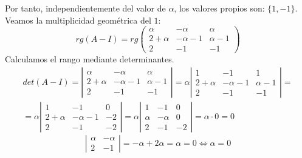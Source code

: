 \begin{ejercicio}
\begin{enumerate}
        Por tanto, independientemente del valor de $\alpha$, los valores propios son: $\{1, -1\}$. Veamos la multiplicidad geométrica del $1$:
        \begin{equation*}
            rg(A-I) = rg\left(\begin{array}{ccc}
            \alpha & -\alpha & \alpha \\
            2+\alpha & -\alpha-1 & \alpha-1 \\
            2 & -1 & -1
        \end{array} \right)
        \end{equation*}
        Calculamos el rango mediante determinantes.
        \begin{multline*}
            det(A-I) = \left|\begin{array}{ccc}
            \alpha & -\alpha & \alpha \\
            2+\alpha & -\alpha-1 & \alpha-1 \\
            2 & -1 & -1
        \end{array} \right| = \alpha \left|\begin{array}{ccc}
            1 & -1 & 1 \\
            2+\alpha & -\alpha-1 & \alpha-1 \\
            2 & -1 & -1
        \end{array} \right| =\\=
        \alpha \left|\begin{array}{ccc}
            1 & -1 & 0 \\
            2+\alpha & -\alpha-1 & -2 \\
            2 & -1 & -2
        \end{array} \right|
        =\alpha \left|\begin{array}{ccc}
            1 & -1 & 0 \\
            \alpha & -\alpha & 0 \\
            2 & -1 & -2
        \end{array} \right| = \alpha \cdot 0 = 0
        \end{multline*}
        \begin{equation*}
            \left| \begin{array}{cc}
                \alpha & -\alpha \\
                2 & -1
            \end{array}\right| = -\alpha +2\alpha = \alpha = 0 \Longleftrightarrow \alpha = 0
        \end{equation*}


\end{enumerate}
\end{ejercicio}
